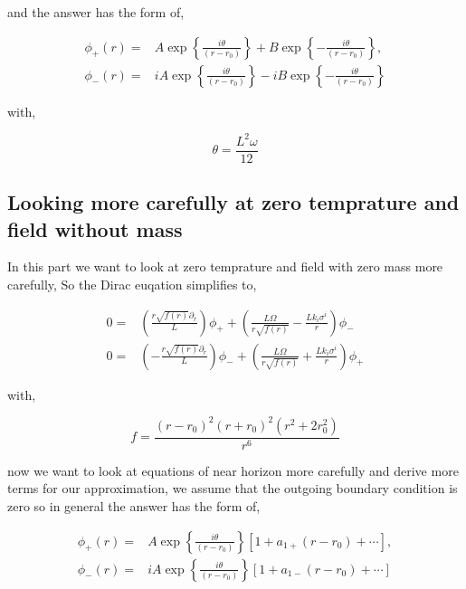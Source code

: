 and the answer has the form of,

\begin{align}
   \phi_{+}(r) =& A\exp\left\{\frac{i\theta}{(r-r_0)}\right\} + B\exp\left\{-\frac{i\theta}{(r-r_0)}\right\}, \nonumber\\
   \phi_{-}(r) =& iA\exp\left\{\frac{i\theta}{(r-r_0)}\right\} - iB\exp\left\{-\frac{i\theta}{(r-r_0)}\right\}
\end{align}

with,

\begin{equation}
   \theta = \frac{L^2\omega}{12}
\end{equation}

\subsection{Looking more carefully at zero temprature and field without mass}

In this part we want to look at zero temprature and field with zero mass more carefully, So the Dirac euqation simplifies to,

\begin{align} \label{DiracEqAdS5ZeroTZeroM}
    0 =& \left( \frac{r\sqrt{f(r)}\partial_r}{L} \right) \phi_{+} + \left( \frac{L\Omega}{r\sqrt{f(r)}} - \frac{Lk_i\sigma^i}{r} \right) \phi_{-} \nonumber\\
    0 =& \left(-\frac{r\sqrt{f(r)}\partial_r}{L} \right) \phi_{-} + \left( \frac{L\Omega}{r\sqrt{f(r)}} + \frac{Lk_i\sigma^i}{r} \right) \phi_{+}
\end{align}

with,

\begin{equation}
   f = \frac{(r-r_0)^2(r+r_0)^2(r^2+2r_0^2)}{r^6}
\end{equation}

now we want to look at equations of near horizon more carefully and derive more terms for our approximation, we assume that the outgoing boundary condition is zero so in general the answer has the form of,

\begin{align} \label{NearHorizonAdS5ZeroTZeroM}
   \phi_{+}(r) =& A\exp\left\{\frac{i\theta}{(r-r_0)}\right\} \left[1 + a_{1+}(r-r_0) + \cdots\right] , \nonumber\\
   \phi_{-}(r) =& iA\exp\left\{\frac{i\theta}{(r-r_0)}\right\} \left[1 + a_{1-}(r-r_0) + \cdots\right]
\end{align}

